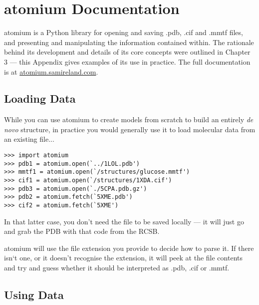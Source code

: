 



\chapter{atomium Documentation} %


atomium is a Python library for opening and saving .pdb, .cif and .mmtf files,
and presenting and manipulating the information contained within. The rationale behind its development and details of its core concepts were outlined in Chapter 3 --- this Appendix gives examples of its use in practice. The full documentation is at \url{atomium.samireland.com}.

\section{Loading Data}

While you can use atomium to create models from scratch to build an entirely \emph{de novo} structure, in practice you would generally use it to load molecular data from an existing file...

\begin{verbatim}
>>> import atomium
>>> pdb1 = atomium.open(`../1LOL.pdb')
>>> mmtf1 = atomium.open(`/structures/glucose.mmtf')
>>> cif1 = atomium.open(`/structures/1XDA.cif')
>>> pdb3 = atomium.open(`./5CPA.pdb.gz')
>>> pdb2 = atomium.fetch(`5XME.pdb')
>>> cif2 = atomium.fetch(`5XME')
\end{verbatim}

In that latter case, you don't need the file to be saved locally --- it will just go and grab the PDB with that code from the RCSB.

atomium will use the file extension you provide to decide how to parse it. If there isn`t one, or it doesn't recognise the extension, it will peek at the file contents and try and guess whether it should be interpreted as .pdb, .cif or .mmtf.

\section{Using Data}

